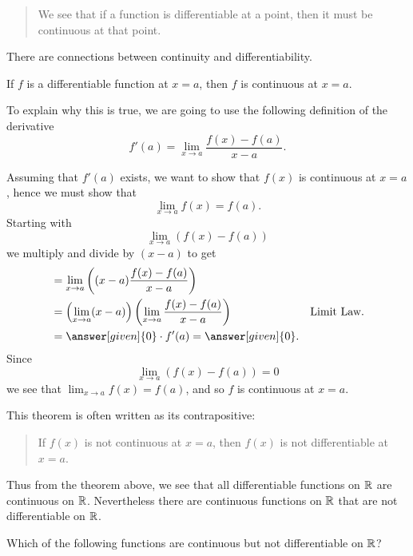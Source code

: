 \documentclass{ximera}
\begin{document}
\begin{abstract}
We see that if a function is differentiable at a point, then it must
be continuous at that point.
\end{abstract}
\maketitle

There are connections between continuity and differentiability.

\begin{theorem}
If $f$ is a differentiable function at $x = a$, then $f$ is continuous
at $x=a$.
\begin{explanation}
To explain why this is true, we are going to use the following
definition of the derivative
\[
f'(a) = \lim_{x\to a} \frac{f(x)-f(a)}{x-a}.
\]

  Assuming that $f'(a)$ exists, we want to show that $f(x)$ is
continuous at $x=a$, hence we must show that
\[
\lim_{x\to a} f(x) = f(a).
\]
Starting with
\[
\lim_{x\to a} \left(f(x) - f(a)\right)
\]
we multiply and divide by $(x-a)$ to get
\begin{align*}
  &= \lim_{x\to a} \left((x-a)\frac{f(x) - f(a)}{x-a}\right) \\
  &= \left(\lim_{x\to a} (x-a) \right) \left(\lim_{x\to a}\frac{f(x) - f(a)}{x-a}\right) &\text{Limit Law.} \\
  &= \answer[given]{0}\cdot f'(a) = \answer[given]{0}.
\end{align*}
Since 
\[
\lim_{x\to a}\left(f(x) - f(a)\right) = 0 
\]
we see that $\lim_{x\to a} f(x) = f(a)$, and so $f$ is continuous at
$x=a$.
\end{explanation}
\end{theorem}

This theorem is often written as its contrapositive:
\begin{quote}
If $f(x)$ is not continuous at $x=a$, then $f(x)$ is not
differentiable at $x=a$.
\end{quote}


Thus from the theorem above, we see that all differentiable functions
on $\mathbb R$ are continuous on $\mathbb R$. Nevertheless there are continuous
functions on $\mathbb R$ that are not differentiable on $\mathbb R$.

\begin{question}
  Which of the following functions are continuous but not
  differentiable on $\mathbb R$?
  \begin{multipleChoice}
  \end{multipleChoice}
\end{question}
\end{document}
